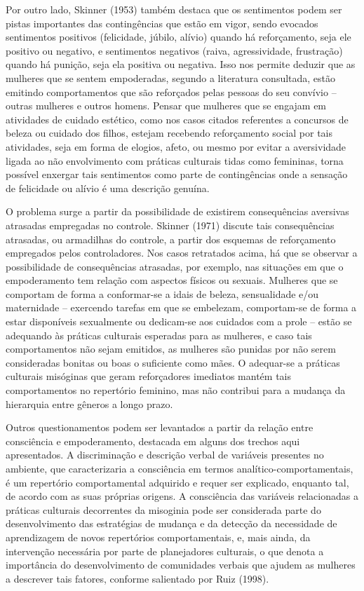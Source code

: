 Por outro lado, Skinner (1953) também destaca que os sentimentos podem ser pistas importantes das contingências que estão em vigor, sendo evocados sentimentos positivos (felicidade, júbilo, alívio) quando há reforçamento, seja ele positivo ou negativo, e sentimentos negativos (raiva, agressividade, frustração) quando há punição, seja ela positiva ou negativa. Isso nos permite deduzir que as mulheres que se sentem empoderadas, segundo a literatura consultada, estão emitindo comportamentos que são reforçados pelas pessoas do seu convívio – outras mulheres e outros homens. Pensar que mulheres que se engajam em atividades de cuidado estético, como nos casos citados referentes a concursos de beleza ou cuidado dos filhos, estejam recebendo reforçamento social por tais atividades, seja em forma de elogios, afeto, ou mesmo por evitar a aversividade ligada ao não envolvimento com práticas culturais tidas como femininas, torna possível enxergar tais sentimentos como parte de contingências onde a sensação de felicidade ou alívio é uma descrição genuína.

O problema surge a partir da possibilidade de existirem consequências aversivas atrasadas empregadas no controle. Skinner (1971) discute tais consequências atrasadas, ou armadilhas do controle, a partir dos esquemas de reforçamento empregados pelos controladores. Nos casos retratados acima, há que se observar a possibilidade de consequências atrasadas, por exemplo, nas situações em que o empoderamento tem relação com aspectos físicos ou sexuais. Mulheres que se comportam de forma a conformar-se a idais de beleza, sensualidade e/ou maternidade – exercendo tarefas em que se embelezam, comportam-se de forma a estar disponíveis sexualmente ou dedicam-se aos cuidados com a prole – estão se adequando às práticas culturais esperadas para as mulheres, e caso tais comportamentos não sejam emitidos, as mulheres são punidas por não serem consideradas bonitas ou boas o suficiente como mães. O adequar-se a práticas culturais misóginas que geram reforçadores imediatos mantém tais comportamentos no repertório feminino, mas não contribui para a mudança da hierarquia entre gêneros a longo prazo.

Outros questionamentos podem ser levantados a partir da relação entre consciência e empoderamento, destacada em alguns dos trechos aqui apresentados. A discriminação e descrição verbal de variáveis presentes no ambiente, que caracterizaria a consciência em termos analítico-comportamentais, é um repertório comportamental adquirido e requer ser explicado, enquanto tal, de acordo com as suas próprias origens. A consciência das variáveis relacionadas a práticas culturais decorrentes da misoginia pode ser considerada parte do desenvolvimento das estratégias de mudança e da detecção da necessidade de aprendizagem de novos repertórios comportamentais, e, mais ainda, da intervenção necessária por parte de planejadores culturais, o que denota a importância do desenvolvimento de comunidades verbais que ajudem as mulheres a descrever tais fatores, conforme salientado por Ruiz (1998).

